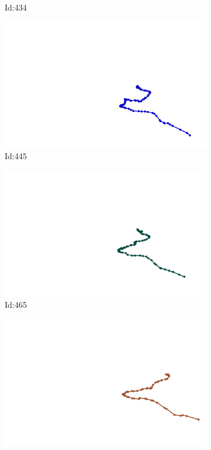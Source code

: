 \documentclass[12pt,twoside]{report}
\begin{document}
\begin{figure}
\begin{subfigure}[b]{0.20\textwidth}
\caption{Id:434}
\end{subfigure}
\begin{subfigure}[b]{0.20\textwidth}
\centering
\includegraphics[width=\textwidth]{../trajectories/445.png}
\caption{Id:445}
\end{subfigure}
\begin{subfigure}[b]{0.20\textwidth}
\centering
\includegraphics[width=\textwidth]{../trajectories/465.png}
\caption{Id:465}
\end{subfigure}
\begin{subfigure}[b]{0.20\textwidth}
\centering
\includegraphics[width=\textwidth]{../trajectories/478.png}

\end{subfigure}
\end{figure}
\end{document}
